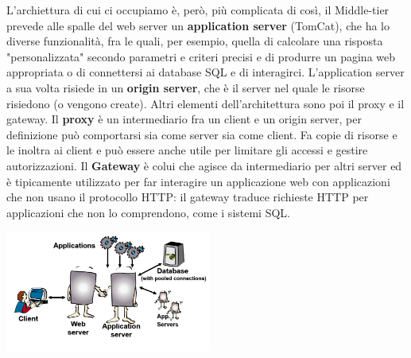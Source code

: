 L'archiettura di cui ci occupiamo è, però, più complicata di così, il Middle-tier prevede alle spalle del web server un \textbf{application server} (TomCat), che ha lo diverse funzionalità, fra le quali, per esempio, quella di calcolare una risposta "personalizzata" secondo parametri e criteri precisi e di produrre un pagina web appropriata o di connettersi ai database SQL e di interagirci.\newline
L'application server a sua volta risiede in un \textbf{origin server}, che è il server nel quale le risorse risiedono (o vengono create).\newline
\newline
Altri elementi dell'architettura sono poi il proxy e il gateway.\newline
Il \textbf{proxy} è un intermediario fra un client e un origin server, per definizione può comportarsi sia come server sia come client. Fa copie di risorse e le inoltra ai client e può essere anche utile per limitare gli accessi e gestire autorizzazioni.\newline
Il \textbf{Gateway} è colui che agisce da intermediario per altri server ed è tipicamente utilizzato per far interagire un applicazione web con applicazioni che non usano il protocollo HTTP: il gateway traduce richieste HTTP per applicazioni che non lo comprendono, come i sistemi SQL.
\begin{center}
    \includegraphics[height=4cm]{../lezione1/img1.PNG}
\end{center}
\newpage

